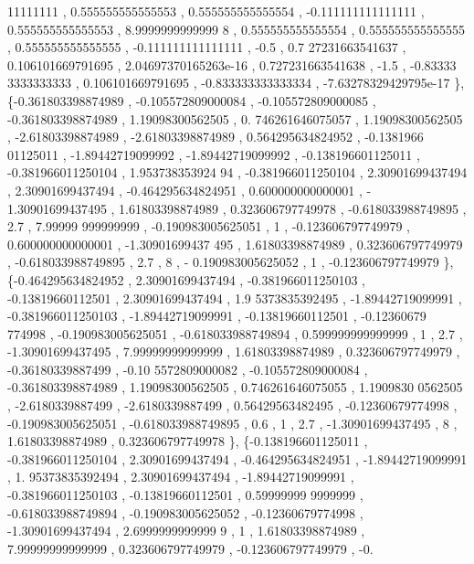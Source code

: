 \begin{DoxyCode}
      11111111 , 0.555555555555553 , 0.555555555555554 , -0.111111111111111 , 0.555555555555553 ,  8.9999999999999
      8 , 0.555555555555554 , 0.555555555555555 , 0.555555555555555 , -0.111111111111111 ,              -0.5 , 0.7
      27231663541637 , 0.106101669791695 , 2.04697370165263e-16 , 0.727231663541638 ,              -1.5 , -0.83333
      3333333333 , 0.106101669791695 , -0.833333333333334 , -7.63278329429795e-17 \},
\{-0.361803398874989 , -0.105572809000084 , -0.105572809000085 , -0.361803398874989 ,  1.19098300562505 , 0.
      746261646075057 ,  1.19098300562505 , -2.61803398874989 , -2.61803398874989 , 0.564295634824952 , -0.1381966
      01125011 , -1.89442719099992 , -1.89442719099992 , -0.138196601125011 , -0.381966011250104 ,  1.953738353924
      94 , -0.381966011250104 ,  2.30901699437494 ,  2.30901699437494 , -0.464295634824951 , 0.600000000000001 , -
      1.30901699437495 ,  1.61803398874989 , 0.323606797749978 , -0.618033988749895 ,               2.7 ,  7.99999
      999999999 , -0.190983005625051 ,                 1 , -0.123606797749979 , 0.600000000000001 , -1.30901699437
      495 ,  1.61803398874989 , 0.323606797749979 , -0.618033988749895 ,               2.7 ,                 8 , -
      0.190983005625052 ,                 1 , -0.123606797749979 \},
\{-0.464295634824952 ,  2.30901699437494 , -0.381966011250103 , -0.13819660112501 ,  2.30901699437494 ,  1.9
      5373835392495 , -1.89442719099991 , -0.381966011250103 , -1.89442719099991 , -0.13819660112501 , -0.12360679
      774998 , -0.190983005625051 , -0.618033988749894 , 0.599999999999999 ,                 1 ,               2.7
       , -1.30901699437495 ,  7.99999999999999 ,  1.61803398874989 , 0.323606797749979 , -0.36180339887499 , -0.10
      5572809000082 , -0.105572809000084 , -0.361803398874989 ,  1.19098300562505 , 0.746261646075055 ,  1.1909830
      0562505 ,  -2.6180339887499 ,  -2.6180339887499 ,  0.56429563482495 , -0.12360679774998 , -0.190983005625051
       , -0.618033988749895 ,               0.6 ,                 1 ,               2.7 , -1.30901699437495 ,     
                  8 ,  1.61803398874989 , 0.323606797749978 \},
\{-0.138196601125011 , -0.381966011250104 ,  2.30901699437494 , -0.464295634824951 , -1.89442719099991 ,  1.
      95373835392494 ,  2.30901699437494 , -1.89442719099991 , -0.381966011250103 , -0.13819660112501 , 0.59999999
      9999999 , -0.618033988749894 , -0.190983005625052 , -0.12360679774998 , -1.30901699437494 ,  2.6999999999999
      9 ,                 1 ,  1.61803398874989 ,  7.99999999999999 , 0.323606797749979 , -0.123606797749979 , -0.

\end{DoxyCode}
